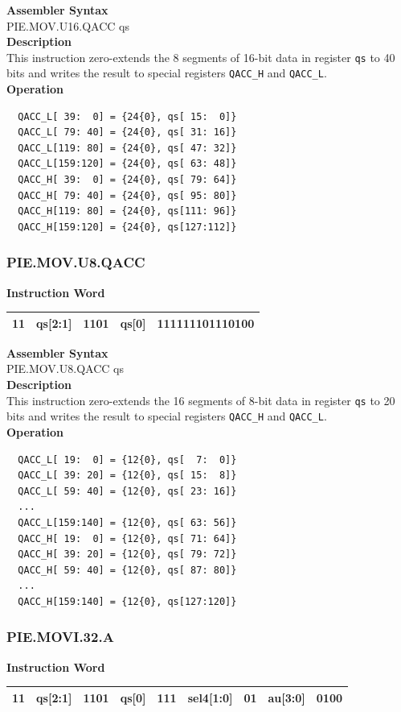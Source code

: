 \textbf{Assembler Syntax} \\
PIE.MOV.U16.QACC qs \\
\textbf{Description} \\
This instruction zero-extends the 8 segments of 16-bit data in register \lstinline{qs} to 40 bits and writes the result to special registers \lstinline{QACC_H} and \lstinline{QACC_L}.\\
\textbf{Operation}
\begin{lstlisting}
  QACC_L[ 39:  0] = {24{0}, qs[ 15:  0]}
  QACC_L[ 79: 40] = {24{0}, qs[ 31: 16]}
  QACC_L[119: 80] = {24{0}, qs[ 47: 32]}
  QACC_L[159:120] = {24{0}, qs[ 63: 48]}
  QACC_H[ 39:  0] = {24{0}, qs[ 79: 64]}
  QACC_H[ 79: 40] = {24{0}, qs[ 95: 80]}
  QACC_H[119: 80] = {24{0}, qs[111: 96]}
  QACC_H[159:120] = {24{0}, qs[127:112]}
\end{lstlisting}

\newpage
\subsubsection{PIE.MOV.U8.QACC}\label{instruction:PIEMOVU8QACC}
\setlength\tabcolsep{6pt}
\textbf{Instruction Word} \\
\begin{tabular}{|c|c|c|c|c|}
	\hline
	11 & qs[2:1] & 1101 & qs[0] & 111111101110100 \\
	\hline
\end{tabular}

\textbf{Assembler Syntax} \\
PIE.MOV.U8.QACC qs \\
\textbf{Description} \\
This instruction zero-extends the 16 segments of 8-bit data in register \lstinline{qs} to 20 bits and writes the result to special registers \lstinline{QACC_H} and \lstinline{QACC_L}.\\
\textbf{Operation}
\begin{lstlisting}
  QACC_L[ 19:  0] = {12{0}, qs[  7:  0]}
  QACC_L[ 39: 20] = {12{0}, qs[ 15:  8]}
  QACC_L[ 59: 40] = {12{0}, qs[ 23: 16]}
  ...
  QACC_L[159:140] = {12{0}, qs[ 63: 56]}
  QACC_H[ 19:  0] = {12{0}, qs[ 71: 64]}
  QACC_H[ 39: 20] = {12{0}, qs[ 79: 72]}
  QACC_H[ 59: 40] = {12{0}, qs[ 87: 80]}
  ...
  QACC_H[159:140] = {12{0}, qs[127:120]}
\end{lstlisting}

\newpage
\subsubsection{PIE.MOVI.32.A}\label{instruction:PIEMOVI32A}
\setlength\tabcolsep{6pt}
\textbf{Instruction Word} \\
\begin{tabular}{|c|c|c|c|c|c|c|c|c|}
	\hline
	11 & qs[2:1] & 1101 & qs[0] & 111 & sel4[1:0] & 01 & au[3:0] & 0100 \\
	\hline
\end{tabular}

